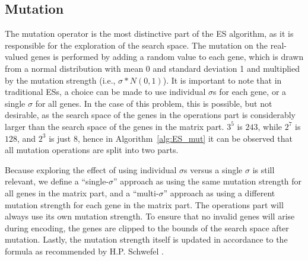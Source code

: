 \documentclass{article}
\begin{document}
\vspace{-0.5cm}
\subsection{Mutation}
\label{sec:ES_mut}
\vspace{-0.2cm}
The mutation operator is the most distinctive part of the ES algorithm, as it is responsible for the exploration of the search space.
The mutation on the real-valued genes is performed by adding a random value to each gene, which is drawn from a normal distribution with mean 0 and standard deviation 1 and multiplied by the mutation strength (i.e., $\sigma * N(0, 1)$).
It is important to note that in traditional ESs, a choice can be made to use individual $\sigma$s for each gene, or a single $\sigma$ for all genes.
In the case of this problem, this is possible, but not desirable, as the search space of the genes in the operations part is considerably larger than the search space of the genes in the matrix part.
$3^5$ is $243$, while $2^7$ is $128$, and $2^3$ is just $8$, hence in Algorithm~\ref{alg:ES_mut} it can be observed that all mutation operations are split into two parts.

Because exploring the effect of using individual $\sigma$s versus a single $\sigma$ is still relevant, we define a ``single-$\sigma$'' approach as using the same mutation strength for all genes in the matrix part, and a ``multi-$\sigma$'' approach as using a different mutation strength for each gene in the matrix part.
The operations part will always use its own mutation strength.
To ensure that no invalid genes will arise during encoding, the genes are clipped to the bounds of the search space after mutation.
Lastly, the mutation strength itself is updated in accordance to the formula as recommended by H.P. Schwefel \cite{tau}.
\end{document}

